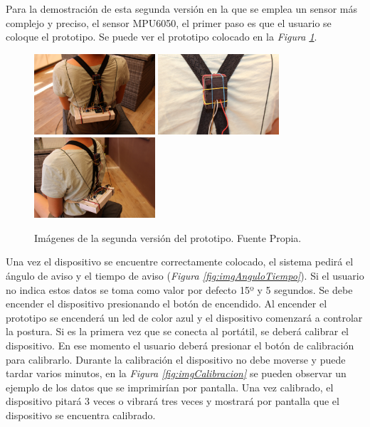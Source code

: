 Para la demostración de esta segunda versión en la que se emplea un sensor más complejo y preciso, el sensor MPU6050\cite{MPU6050_1,MPU6050_2}, el primer paso es que el usuario se coloque el prototipo. Se puede ver el prototipo colocado en la \textit{Figura \ref{fig:imgDispositivo_V2}}.

\begin{figure}[h!]
    \centering
    \includegraphics[width=0.4\textwidth]{img/Disp_V2_1.jpg}
    \includegraphics[width=0.4\textwidth]{img/Disp_V2_2.jpg}
    \includegraphics[width=0.4\textwidth]{img/Disp_V2_3.jpg}
    \caption{Imágenes de la segunda versión del prototipo. Fuente Propia.}
    \label{fig:imgDispositivo_V2} 
\end{figure}

Una vez el dispositivo se encuentre correctamente colocado, el sistema pedirá el ángulo de aviso y el tiempo de aviso (\textit{Figura \ref{fig:imgAnguloTiempo}}). Si el usuario no indica estos datos se toma como valor por defecto 15º y 5 segundos. Se debe encender el dispositivo presionando el botón de encendido. Al encender el prototipo se encenderá un led de color azul y el dispositivo comenzará a controlar la postura. Si es la primera vez que se conecta al portátil, se deberá calibrar el dispositivo. En ese momento el usuario deberá presionar el botón de calibración para calibrarlo. Durante la calibración el dispositivo no debe moverse y puede tardar varios minutos, en la \textit{Figura \ref{fig:imgCalibracion}} se pueden observar un ejemplo de los datos que se imprimirían por pantalla. Una vez calibrado, el dispositivo pitará 3 veces o vibrará tres veces y mostrará por pantalla que el dispositivo se encuentra calibrado.

